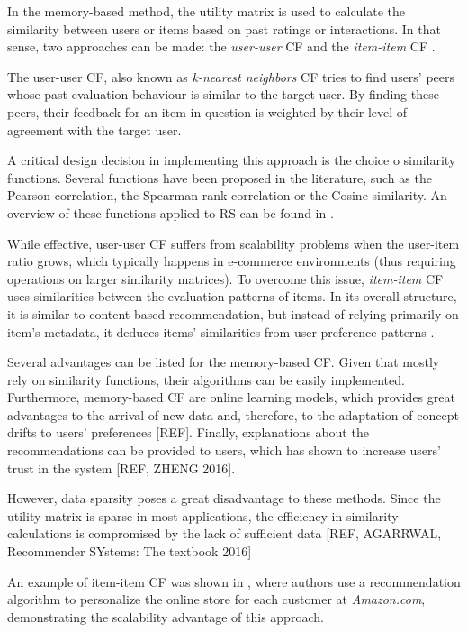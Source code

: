     In the memory-based method, the utility matrix is used to calculate the similarity between 
    users or items based on past ratings or interactions. In that sense, two approaches can be made:
    the \textit{user-user} CF and the \textit{item-item} CF \cite{2011ekstrand}. 
    
    The user-user CF, also known as \textit{k-nearest neighbors} CF tries to find users' peers 
    whose past evaluation behaviour is similar to the target user. By finding these peers, their 
    feedback for an item in question is weighted by their level of agreement with the target user.  
    
    A critical design decision in implementing this approach is the choice o similarity functions. 
    Several functions have been proposed in the literature, such as the Pearson correlation, the 
    Spearman rank correlation or the Cosine similarity. An overview of these functions applied to RS
    can be found in \cite{2011ekstrand}.
    
    While effective, user-user CF suffers from scalability problems when the user-item ratio grows, which typically happens in e-commerce environments (thus requiring operations on larger similarity matrices). To overcome this issue, \textit{item-item} CF uses similarities between the evaluation patterns of items. In its overall structure, it is similar to content-based recommendation, but instead of relying primarily on item's metadata, it deduces items' similarities from user preference patterns \cite{2001sarwar}.

    Several advantages can be listed for the memory-based CF. Given that mostly rely on similarity     functions, their algorithms can be easily implemented. Furthermore, memory-based CF are online     learning models, which provides great advantages to the arrival of new data and, therefore, to the adaptation of concept drifts to users' preferences [REF]. Finally, explanations about the     recommendations can be provided to users, which has shown to increase users' trust in the system     [REF, ZHENG 2016].

    However, data sparsity poses a great disadvantage to these methods. Since the utility matrix is 
    sparse in most applications, the efficiency in similarity calculations is compromised by the lack 
    of sufficient data [REF, AGARRWAL, Recommender SYstems: The textbook 2016]
    
    An example of item-item CF was shown in \cite{2003amazon}, where authors use a recommendation 
    algorithm to personalize the online store for each customer at \textit{Amazon.com}, demonstrating 
    the scalability advantage of this approach.

